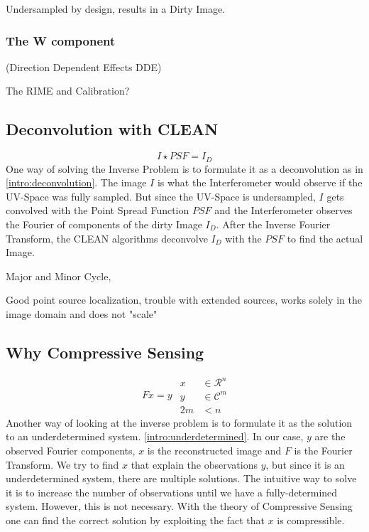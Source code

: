 Undersampled by design, results in a Dirty Image.

\subsubsection{The W component}

(Direction Dependent Effects DDE)

The RIME and Calibration?


\subsection{Deconvolution with CLEAN}
\begin{equation}\label{intro:deconvolution}
I \star PSF = I_D
\end{equation}
One way of solving the Inverse Problem is to formulate it as a deconvolution as in \eqref{intro:deconvolution}. The image $I$ is what the Interferometer would observe if the UV-Space was fully sampled. But since the UV-Space is undersampled, $I$ gets convolved with the Point Spread Function $PSF$ and the Interferometer observes the Fourier of components of the dirty Image $I_D$. After the Inverse Fourier Transform, the CLEAN algorithms deconvolve $I_D$ with the $PSF$ to find the actual Image.

Major and Minor Cycle,

Good point source localization, trouble with extended sources, works solely in the image domain and does not "scale"

\subsection{Why Compressive Sensing}

\begin{equation}\label{intro:underdetermined}
\begin{split}
Fx = y
\end{split}
\begin{split}
x &\in \mathcal{R}^n\\
y &\in \mathcal{C}^m\\
2m &< n
\end{split}
\end{equation}
Another way of looking at the inverse problem is to formulate it as the solution to an underdetermined system. \eqref{intro:underdetermined}. In our case, $y$ are the observed Fourier components, $x$ is the reconstructed image and $F$ is the Fourier Transform. We try to find $x$ that explain the observations $y$, but since it is an underdetermined system, there are multiple solutions. The intuitive way to solve it is to increase the number of observations until we have a fully-determined system. However, this is not necessary. With the theory of Compressive Sensing one can find the correct solution by exploiting the fact that $x$ is compressible.

